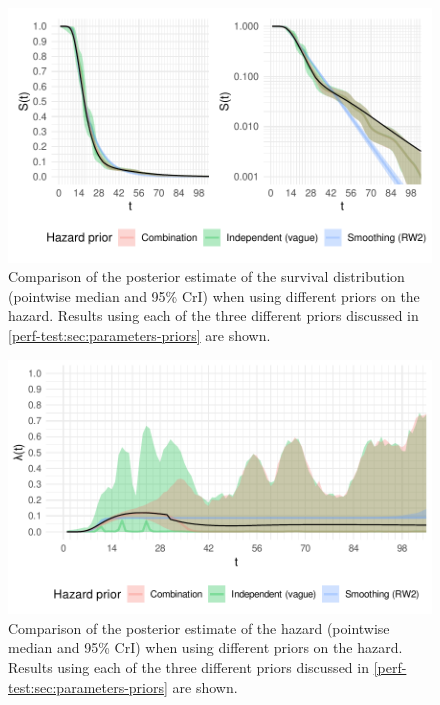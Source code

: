 \documentclass[thesis.tex]{subfiles}
\begin{document}
\begin{figure}
  \centering \includegraphics{cis-perfect-testing/survival-results}
  \caption[Comparison of survival function estimates under different priors]{Comparison of the posterior estimate of the survival distribution (pointwise median and 95\% CrI) when using different priors on the hazard. Results using each of the three different priors discussed in \cref{perf-test:sec:parameters-priors} are shown. \label{perf-test:fig:survival-results}}
\end{figure}

\begin{figure}
  \centering \includegraphics{cis-perfect-testing/hazard-results}
  \caption[Comparison of hazard estimates under different priors]{Comparison of the posterior estimate of the hazard (pointwise median and 95\% CrI) when using different priors on the hazard. Results using each of the three different priors discussed in \cref{perf-test:sec:parameters-priors} are shown. \label{perf-test:fig:hazard-results}}
\end{figure}
\end{document}
